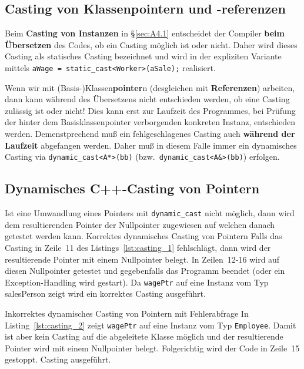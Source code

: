 \subsection{Casting von Klassenpointern und -referenzen}
\label{sec:A4.2}
%
Beim \textbf{Casting von Instanzen} in \S\ref{sec:A4.1} entscheidet der Compiler \textbf{beim Übersetzen} des Codes, ob 
ein Casting möglich ist oder nicht. Daher wird dieses Casting als statisches Casting bezeichnet und wird in der expliziten Variante mittels \verb|aWage = static_cast<Worker>(aSale);|  realisiert.

Wenn wir mit (Basis-)Klassen\textbf{pointer}n (desgleichen mit \textbf{Referenzen}) arbeiten, dann kann während des Übersetzens nicht entschieden werden, ob eine Casting zulässig ist oder nicht!
Dies kann erst zur Laufzeit des Programmes, bei Prüfung der hinter dem Basisklassenpointer verborgenden konkreten Instanz, 
entschieden werden. Demenstprechend muß ein fehlgeschlagenes Casting auch \textbf{während der Laufzeit} abgefangen werden.
Daher muß in diesem Falle immer ein dynamisches Casting via 
\verb|dynamic_cast<A*>(bb)| (bzw.\  \verb|dynamic_cast<A&>(bb)|) erfolgen.
%
%
\subsection{Dynamisches C++-Casting von Pointern}
\label{sec:A4.2.1}
%
%
Ist eine Umwandlung eines Pointers mit \verb|dynamic_cast| nicht möglich, dann wird dem 
resultierenden Pointer der Nullpointer zugewiesen auf welchen danach getestet werden kann.
%
{Korrektes dynamisches Casting von Pointern}
%
Falls das Casting in Zeile~11 des Listings~\ref{lst:casting_1} fehlschlägt, dann wird der resultierende Pointer 
mit einem Nullpointer belegt. In Zeilen~12-16 wird auf diesen Nullpointer getestet und gegebenfalls das Programm beendet 
(oder ein Exception-Handling wird gestart). Da \verb|wagePtr| auf eine Instanz vom Typ salesPerson zeigt wird ein korrektes 
Casting ausgeführt. 

%
{Inkorrektes dynamisches Casting von Pointern mit Fehlerabfrage}
%
In Listing~\ref{lst:casting_2} zeigt \verb|wagePtr| auf eine Instanz vom Typ \texttt{Employee}. 
Damit ist aber kein Casting auf die abgeleitete Klasse möglich und der resultierende Pointer wird 
mit einem Nullpointer belegt. Folgerichtig wird der Code in Zeile~15 gestoppt. 
Casting ausgeführt. 
%
%
